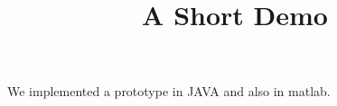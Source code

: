 \documentclass[article]{jss}
\title{A Short Demo}
\begin{document}
We implemented a prototype in JAVA and also in matlab.
\end{document}
